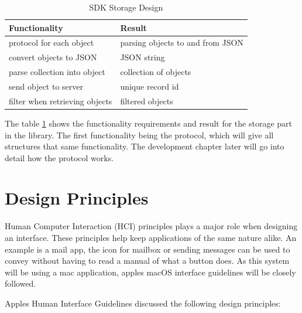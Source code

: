 \begin{table}[!h]
\centering
\caption{SDK Storage Design}
\label{tb:storage_design}
\begin{tabular}{|l|l|}
\hline
\rowcolor{green!20}
Functionality                  & Result                \\ \hline
protocol for each object       & parsing objects to and from JSON \\ \hline
convert objects to JSON        & JSON string \\ \hline
parse collection into object   & collection of objects \\ \hline
send object to server          & unique record id      \\ \hline
filter when retrieving objects & filtered objects      \\ \hline
\end{tabular}
\end{table}

The table \ref{tb:storage_design} shows the functionality requirements and result for the storage part in the library. The first functionality being the protocol, which will give all structures that same functionality. The development chapter later will go into detail how the protocol works.

\section{Design Principles}
Human Computer Interaction (HCI) principles plays a major role when designing an interface. These principles help keep applications of the same nature alike. An example is a mail app, the icon for mailbox or sending messages can be used to convey without having to read a manual of what a button does. As this system will be using a mac application, apples macOS interface guidelines will be closely followed.

Apples Human Interface Guidelines \cite{guidelines} discussed the following design principles:

